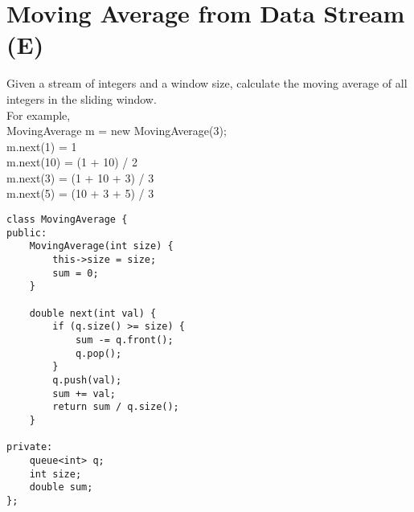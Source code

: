 \section{Moving Average from Data Stream (E)}
Given a stream of integers and a window size, calculate the moving average of all integers in the sliding window.\\

For example,\\
MovingAverage m = new MovingAverage(3);\\
m.next(1) = 1\\
m.next(10) = (1 + 10) / 2\\
m.next(3) = (1 + 10 + 3) / 3\\
m.next(5) = (10 + 3 + 5) / 3 \\

\begin{lstlisting}
class MovingAverage {
public:
    MovingAverage(int size) {
        this->size = size;
        sum = 0;
    }
    
    double next(int val) {
        if (q.size() >= size) {	
            sum -= q.front();
            q.pop();
        }
        q.push(val);
        sum += val;
        return sum / q.size();
    }
    
private:
    queue<int> q;
    int size;
    double sum;
};
\end{lstlisting}





